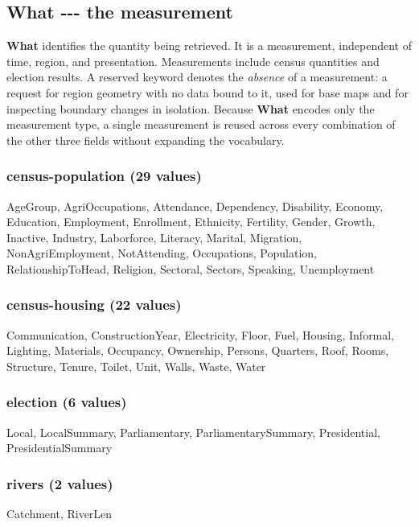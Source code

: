 \documentclass[10pt,a4paper]{article}%
\begin{document}
\subsection{What {-}{-}{-} the measurement}%
\label{subsec:What{-}{-}{-}themeasurement}%
\textbf{What} identifies the quantity being retrieved. It is a measurement, independent of time, region, and presentation. Measurements include census quantities and election results. A reserved keyword denotes the \emph{absence} of a measurement: a request for region geometry with no data bound to it, used for base maps and for inspecting boundary changes in isolation. Because \textbf{What} encodes only the measurement type, a single measurement is reused across every combination of the other three fields without expanding the vocabulary.%
\subsubsection*{census{-}population (29 values)}%
\label{ssubsec:census{-}population(29values)}%
AgeGroup, AgriOccupations, Attendance, Dependency, Disability, Economy, Education, Employment, Enrollment, Ethnicity, Fertility, Gender, Growth, Inactive, Industry, Laborforce, Literacy, Marital, Migration, NonAgriEmployment, NotAttending, Occupations, Population, RelationshipToHead, Religion, Sectoral, Sectors, Speaking, Unemployment

%
\subsubsection*{census{-}housing (22 values)}%
\label{ssubsec:census{-}housing(22values)}%
Communication, ConstructionYear, Electricity, Floor, Fuel, Housing, Informal, Lighting, Materials, Occupancy, Ownership, Persons, Quarters, Roof, Rooms, Structure, Tenure, Toilet, Unit, Walls, Waste, Water

%
\subsubsection*{election (6 values)}%
\label{ssubsec:election(6values)}%
Local, LocalSummary, Parliamentary, ParliamentarySummary, Presidential, PresidentialSummary

%
\subsubsection*{rivers (2 values)}%
\label{ssubsec:rivers(2values)}%
Catchment, RiverLen

%
\end{document}
